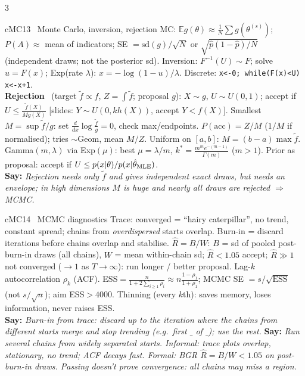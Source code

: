 \documentclass{article}
\newcommand{\h}[1]{{\bfseries #1}\ }
\newcommand{\say}[1]{{\color{cMC!75!black}\textbf{Say:}} \emph{#1}}
\newcommand{\E}{\mathbb E}
\newcommand{\rc}[1]{\texttt{#1}}
\begin{document}
\begin{multicols*}{3}
\begin{tb}{cMC}{13 \textbullet\ Monte Carlo, inversion, rejection}
MC: $\E g(\theta)\approx\frac1N\sum g(\theta^{(s)})$; $P(A)\approx$ mean of indicators; SE $=\text{sd}(g)/\sqrt N$ or $\sqrt{\hat p(1-\hat p)/N}$ (independent draws; not the posterior sd).
Inversion: $F^{-1}(U)\sim F$; solve $u=F(x)$; Exp(rate $\lambda$): $x=-\log(1-u)/\lambda$. Discrete: \rc{x<-0; while(F(x)<U) x<-x+1}.\\
\h{Rejection} (target $\tilde f\propto f$, $Z=\int\tilde f$; proposal $g$): $X\sim g$, $U\sim U(0,1)$; accept if $U\le\frac{\tilde f(X)}{Mg(X)}$ [slides: $Y\sim U(0,kh(X))$, accept $Y<f(X)$]. Smallest $M=\sup\tilde f/g$: set $\frac{d}{dx}\log\frac{\tilde f}{g}=0$, check max/endpoints. $P(\text{acc})=Z/M$ ($1/M$ if normalised); tries $\sim$Geom, mean $M/Z$. Uniform on $[a,b]$: $M=(b-a)\max\tilde f$. Gamma$(m,\lambda)$ via Exp$(\mu)$: best $\mu=\lambda/m$, $k^*=\frac{m^me^{-(m-1)}}{\Gamma(m)}$ ($m>1$). Prior as proposal: accept if $U\le p(x|\theta)/p(x|\hat\theta_{\rm MLE})$.\\
\say{Rejection needs only $\tilde f$ and gives independent exact draws, but needs an envelope; in high dimensions $M$ is huge and nearly all draws are rejected $\Rightarrow$ MCMC.}
\end{tb}

\begin{tb}{cMC}{14 \textbullet\ MCMC diagnostics}
Trace: converged = ``hairy caterpillar'', no trend, constant spread; chains from \emph{overdispersed} starts overlap. Burn-in = discard iterations before chains overlap and stabilise.
$\hat R=B/W$: $B$ = sd of pooled post-burn-in draws (all chains), $W$ = mean within-chain sd; $\hat R<1.05$ accept; $\hat R\gg1$ not converged ($\to1$ as $T\to\infty$): run longer / better proposal.
Lag-$k$ autocorrelation $\rho_k$ (ACF). ESS$=\frac{n}{1+2\sum_{i\ge1}\rho_i}\approx n\frac{1-\rho_1}{1+\rho_1}$; MCMC SE $=s/\sqrt{\text{ESS}}$ (not $s/\sqrt n$); aim ESS$>4000$. Thinning (every $k$th): saves memory, loses information, never raises ESS.\\
\say{Burn-in from trace: discard up to the iteration where the chains from different starts merge and stop trending (e.g.\ first $\_$ of $\_$); use the rest.}
\say{Run several chains from widely separated starts. Informal: trace plots overlap, stationary, no trend; ACF decays fast. Formal: BGR $\hat R=B/W<1.05$ on post-burn-in draws. Passing doesn't prove convergence: all chains may miss a region.}
\end{tb}


\end{multicols*}
\end{document}

